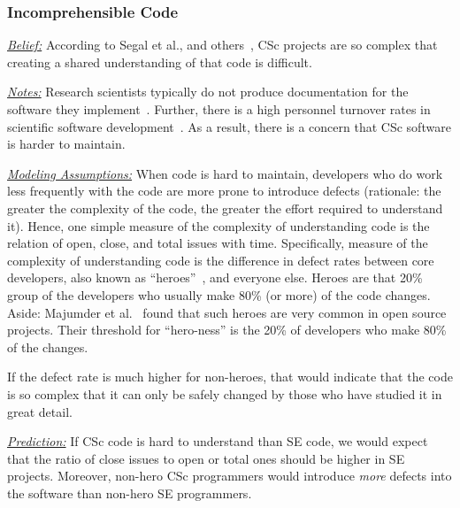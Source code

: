 \documentclass[conference,10pt]{IEEEtran}
\begin{document}
\subsubsection{Incomprehensible Code}\label{tion:codeunderstanding}

\noindent \textit{\underline{Belief:}} According to
Segal et al., and others~\cite{segal_enduser, carver06_hpc, Shull05_parallel, sanders08_risk},
CSc projects are so complex that creating
a shared understanding of that code is difficult. 


\noindent \textit{\underline{Notes:}} Research scientists typically do not produce documentation for the software they implement~\cite{segal_enduser, sanders08_risk}.
Further, there is a high personnel turnover rates in scientific software development~\cite{carver06_hpc, segal_enduser}. As a result, there is a concern that CSc software is harder to maintain. 

\noindent \textit{\underline{Modeling Assumptions:}} 
When code is hard to maintain,
developers who do work less frequently with the code are more prone to introduce defects
(rationale: the greater the complexity of the code, the greater the effort required to understand it).
Hence, one simple measure of the complexity of understanding code is the relation of open, close, and total issues with time. Specifically, measure of the complexity of understanding code
is the difference in defect rates between core developers, also known as ``heroes''~\cite{agrawal2018we, goeminne2011evidence, torres2011analysis, robles2009evolution}, and everyone else.
Heroes are that  20\% group of the developers who usually make 80\% (or more) of the code changes. Aside:   Majumder et al.~\cite{majumder19_heroes} found that such heroes are very common in open source projects. Their threshold for ``hero-ness'' is the 20\% of developers
who make 80\% of the changes. 

If the defect rate is much higher for non-heroes, that would
indicate that the code is so complex that it can only
be safely changed by those who have studied it in great detail.


\noindent \textit{\underline{Prediction:}} If CSc code is hard to understand than SE code, we would expect that the ratio of close issues to open or total ones should be higher in SE projects. Moreover, non-hero CSc programmers would
introduce {\em more} defects into the software than non-hero SE programmers. 
\end{document}
